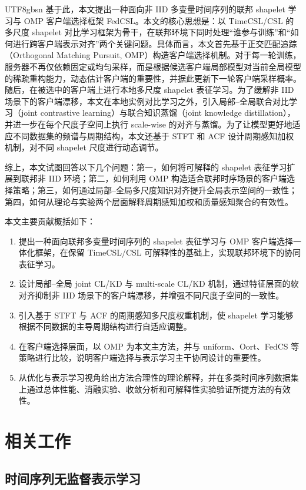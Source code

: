 \documentclass{article}
\begin{document}
\begin{CJK*}{UTF8}{gbsn}
基于此，本文提出一种面向非 IID 多变量时间序列的联邦 shapelet 学习与 OMP 客户端选择框架 FedCSL。本文的核心思想是：以 TimeCSL/CSL 的多尺度 shapelet 对比学习框架为骨干，在联邦环境下同时处理“谁参与训练”和“如何进行跨客户端表示对齐”两个关键问题。具体而言，本文首先基于正交匹配追踪（Orthogonal Matching Pursuit, OMP）构造客户端选择机制。对于每一轮训练，服务器不再仅依赖固定或均匀采样，而是根据候选客户端局部模型对当前全局模型的稀疏重构能力，动态估计客户端的重要性，并据此更新下一轮客户端采样概率。随后，在被选中的客户端上进行本地多尺度 shapelet 表征学习。为了缓解非 IID 场景下的客户端漂移，本文在本地实例对比学习之外，引入局部--全局联合对比学习（joint contrastive learning）与联合知识蒸馏（joint knowledge distillation），并进一步在每个尺度子空间上执行 scale-wise 的对齐与蒸馏。为了让模型更好地适应不同数据集的频谱与周期结构，本文还基于 STFT 和 ACF 设计周期感知加权机制，对不同 shapelet 尺度进行动态调节。

综上，本文试图回答以下几个问题：第一，如何将可解释的 shapelet 表征学习扩展到联邦非 IID 环境；第二，如何利用 OMP 构造适合联邦时序场景的客户端选择策略；第三，如何通过局部--全局多尺度知识对齐提升全局表示空间的一致性；第四，如何从理论与实验两个层面解释周期感知加权和质量感知聚合的有效性。

本文主要贡献概括如下：
\begin{enumerate}[leftmargin=2.5em]
    \item 提出一种面向联邦多变量时间序列的 shapelet 表征学习与 OMP 客户端选择一体化框架，在保留 TimeCSL/CSL 可解释性的基础上，实现联邦环境下的协同表征学习。
    \item 设计局部--全局 joint CL/KD 与 multi-scale CL/KD 机制，通过特征层面的软对齐抑制非 IID 场景下的客户端漂移，并增强不同尺度子空间的一致性。
    \item 引入基于 STFT 与 ACF 的周期感知多尺度权重机制，使 shapelet 学习能够根据不同数据的主导周期结构进行自适应调整。
    \item 在客户端选择层面，以 OMP 为本文主方法，并与 uniform、Oort、FedCS 等策略进行比较，说明客户端选择与表示学习主干协同设计的重要性。
    \item 从优化与表示学习视角给出方法合理性的理论解释，并在多类时间序列数据集上通过总体性能、消融实验、收敛分析和可解释性实验验证所提方法的有效性。
\end{enumerate}

\section{相关工作}

\subsection{时间序列无监督表示学习}


\end{CJK*}
\end{document}
